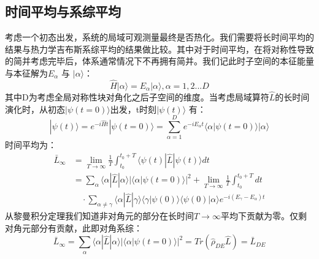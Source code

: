 \subsection{时间平均与系综平均}
考虑一个初态出发，系统的局域可观测量最终是否热化。我们需要将长时间平均的结果与热力学吉布斯系综平均的结果做比较。其中对于时间平均，在将对称性导致的简并考虑完毕后，体系通常情况下不再拥有简并。我们记此时子空间的本征能量与本征解为$E_\alpha$ 与 $|\alpha\rangle$：
\begin{equation}
\hat{H} |\alpha\rangle = E_\alpha |\alpha\rangle, \alpha=1,2...D
\end{equation}
其中D为考虑全局对称性块对角化之后子空间的维度。当考虑局域算符$\hat{L}$的长时间演化时，从初态$|\psi(t=0)\rangle$出发，t时刻$|\psi(t)\rangle$ 有：
\begin{equation}
|\psi(t)\rangle = e^{-i\hat{H}t}|\psi(t=0)\rangle = \sum_{\alpha=1}^D e^{-i E_\alpha t} \langle\alpha|\psi(t=0) \rangle  |\alpha\rangle
\end{equation}
时间平均为：
\begin{equation}
\begin{split}
	\bar{L}_{\infty}  &= \lim_{T\to \infty} \frac{1}{T} \int_{t_0}^{t_0+T} \langle\psi(t)|\hat{L}|\psi(t)\rangle dt \\
		\quad &=  \sum_{\alpha} \langle\alpha|\hat{L}|\alpha\rangle |\langle\alpha|\psi(t=0)\rangle|^2  +  \lim_{T\to \infty} \frac{1}{T} \int_{t_0}^{t_0+T} dt \\
		&\quad \cdot\sum_{\alpha\neq\gamma} \langle\alpha|\hat{L}|\gamma\rangle \langle\gamma|\psi(0)\rangle \langle\psi(0)|\alpha\rangle e^{-i(E_\gamma-E_\alpha)t}
\end{split}
\end{equation}
从黎曼积分定理我们知道非对角元的部分在长时间$T\to\infty$平均下贡献为零。仅剩对角元部分有贡献，此即对角系综：
\begin{equation}
	\bar{L}_{\infty} =  \sum_{\alpha} \langle\alpha|\hat{L}|\alpha\rangle |\langle\alpha|\psi(t=0)\rangle|^2  = Tr(\hat{\rho}_{DE}\hat{L}) = \bar{L}_{DE}
\end{equation}

